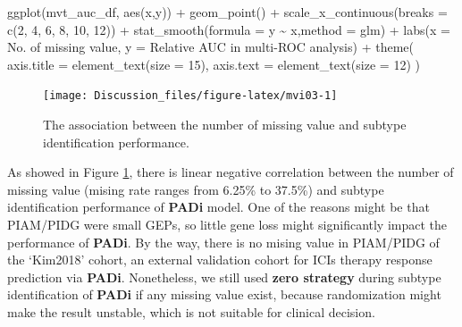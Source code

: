 \documentclass[
  12pt,
]{book}
\newenvironment{Shaded}{\begin{snugshade}}{\end{snugshade}}
\newcommand{\AttributeTok}[1]{\textcolor[rgb]{0.77,0.63,0.00}{#1}}
\newcommand{\DecValTok}[1]{\textcolor[rgb]{0.00,0.00,0.81}{#1}}
\newcommand{\FunctionTok}[1]{\textcolor[rgb]{0.00,0.00,0.00}{#1}}
\newcommand{\NormalTok}[1]{#1}
\newcommand{\SpecialCharTok}[1]{\textcolor[rgb]{0.00,0.00,0.00}{#1}}
\newcommand{\StringTok}[1]{\textcolor[rgb]{0.31,0.60,0.02}{#1}}
\begin{document}
\begin{Shaded}
\begin{Highlighting}[]
\FunctionTok{ggplot}\NormalTok{(mvt\_auc\_df, }\FunctionTok{aes}\NormalTok{(x,y)) }\SpecialCharTok{+}
  \FunctionTok{geom\_point}\NormalTok{() }\SpecialCharTok{+}
  \FunctionTok{scale\_x\_continuous}\NormalTok{(}\AttributeTok{breaks =} \FunctionTok{c}\NormalTok{(}\DecValTok{2}\NormalTok{, }\DecValTok{4}\NormalTok{, }\DecValTok{6}\NormalTok{, }\DecValTok{8}\NormalTok{, }\DecValTok{10}\NormalTok{, }\DecValTok{12}\NormalTok{)) }\SpecialCharTok{+} 
  \FunctionTok{stat\_smooth}\NormalTok{(}\AttributeTok{formula =}\NormalTok{ y }\SpecialCharTok{\textasciitilde{}}\NormalTok{ x,}\AttributeTok{method =} \StringTok{\textquotesingle{}glm\textquotesingle{}}\NormalTok{) }\SpecialCharTok{+}
  \FunctionTok{labs}\NormalTok{(}\AttributeTok{x =} \StringTok{\textquotesingle{}No. of missing value\textquotesingle{}}\NormalTok{, }
       \AttributeTok{y =} \StringTok{\textquotesingle{}Relative AUC in multi{-}ROC analysis\textquotesingle{}}\NormalTok{) }\SpecialCharTok{+}
  \FunctionTok{theme}\NormalTok{(}
    \AttributeTok{axis.title =} \FunctionTok{element\_text}\NormalTok{(}\AttributeTok{size =} \DecValTok{15}\NormalTok{),}
    \AttributeTok{axis.text =} \FunctionTok{element\_text}\NormalTok{(}\AttributeTok{size =} \DecValTok{12}\NormalTok{)}
\NormalTok{  )}
\end{Highlighting}
\end{Shaded}

\begin{figure}

{\centering \texttt{[image: Discussion\_files/figure-latex/mvi03-1]} 

}

\caption{The association between the number of missing value and subtype identification performance.}\label{fig:mvi03}
\end{figure}

As showed in Figure \ref{fig:mvi03}, there is linear negative correlation between the number of missing value (mising rate ranges from 6.25\% to 37.5\%) and subtype identification performance of \textbf{PADi} model. One of the reasons might be that PIAM/PIDG were small GEPs, so little gene loss might significantly impact the performance of \textbf{PADi}. By the way, there is no mising value in PIAM/PIDG of the `Kim2018' cohort, an external validation cohort for ICIs therapy response prediction via \textbf{PADi}. Nonetheless, we still used \textbf{zero strategy} during subtype identification of \textbf{PADi} if any missing value exist, because randomization might make the result unstable, which is not suitable for clinical decision.
\end{document}
